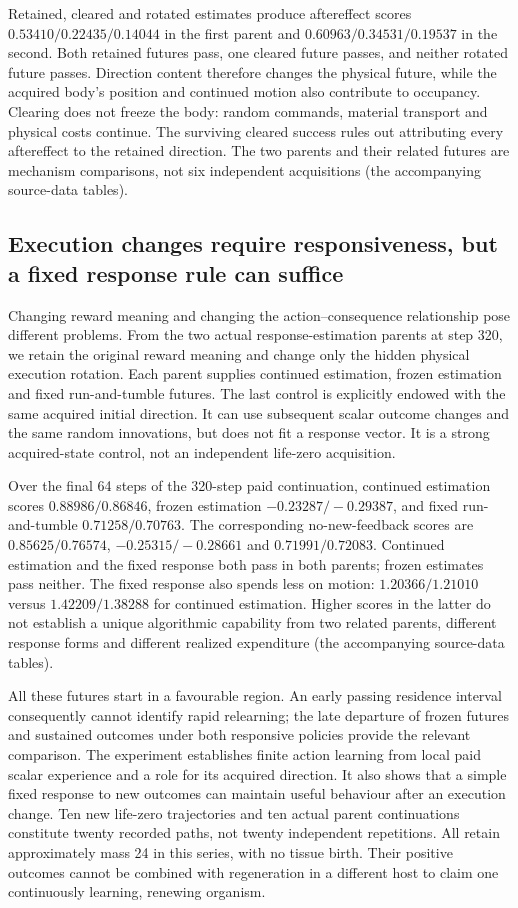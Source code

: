 Retained, cleared and rotated estimates produce aftereffect scores $0.53410/0.22435/0.14044$ in the first parent and $0.60963/0.34531/0.19537$ in the second. Both retained futures pass, one cleared future passes, and neither rotated future passes. Direction content therefore changes the physical future, while the acquired body's position and continued motion also contribute to occupancy. Clearing does not freeze the body: random commands, material transport and physical costs continue. The surviving cleared success rules out attributing every aftereffect to the retained direction. The two parents and their related futures are mechanism comparisons, not six independent acquisitions (the accompanying source-data tables).

\subsection*{Execution changes require responsiveness, but a fixed response rule can suffice}

Changing reward meaning and changing the action--consequence relationship pose different problems. From the two actual response-estimation parents at step 320, we retain the original reward meaning and change only the hidden physical execution rotation. Each parent supplies continued estimation, frozen estimation and fixed run-and-tumble futures. The last control is explicitly endowed with the same acquired initial direction. It can use subsequent scalar outcome changes and the same random innovations, but does not fit a response vector. It is a strong acquired-state control, not an independent life-zero acquisition.

Over the final 64 steps of the 320-step paid continuation, continued estimation scores $0.88986/0.86846$, frozen estimation $-0.23287/-0.29387$, and fixed run-and-tumble $0.71258/0.70763$. The corresponding no-new-feedback scores are $0.85625/0.76574$, $-0.25315/-0.28661$ and $0.71991/0.72083$. Continued estimation and the fixed response both pass in both parents; frozen estimates pass neither. The fixed response also spends less on motion: $1.20366/1.21010$ versus $1.42209/1.38288$ for continued estimation. Higher scores in the latter do not establish a unique algorithmic capability from two related parents, different response forms and different realized expenditure (the accompanying source-data tables).

All these futures start in a favourable region. An early passing residence interval consequently cannot identify rapid relearning; the late departure of frozen futures and sustained outcomes under both responsive policies provide the relevant comparison. The experiment establishes finite action learning from local paid scalar experience and a role for its acquired direction. It also shows that a simple fixed response to new outcomes can maintain useful behaviour after an execution change. Ten new life-zero trajectories and ten actual parent continuations constitute twenty recorded paths, not twenty independent repetitions. All retain approximately mass 24 in this series, with no tissue birth. Their positive outcomes cannot be combined with regeneration in a different host to claim one continuously learning, renewing organism.

